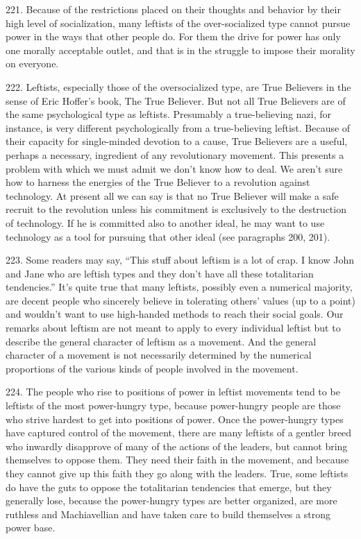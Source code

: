 \documentclass{article}
\begin{document}
221.  Because  of  the  restrictions  placed  on  their  thoughts  and  behavior  by  their  high  level  of  
socialization, many leftists of the over-socialized type cannot pursue power in the ways that other 
people do.  For them the drive for power has only one morally acceptable outlet, and that is in the 
struggle to impose their morality on everyone. \vspace{\baselineskip}

222.  Leftists, especially those of the oversocialized type, are True Believers in the sense of Eric 
Hoffer’s book, The True Believer. But not all True Believers are of the same psychological type 
as leftists.  Presumably a true-believing nazi, for instance, is very different psychologically from a 
true-believing  leftist.   Because  of  their  capacity  for  single-minded  devotion  to  a  cause,  True  
Believers  are  a  useful,  perhaps  a  necessary,  ingredient  of  any  revolutionary  movement.   This 
presents a problem with which we must admit we don’t know how to deal.  We aren’t sure how to 
harness the energies of the True Believer to a revolution against technology.  At present all we can 
say is that no True Believer will make a safe recruit to the revolution unless his commitment is 
exclusively to the destruction of technology.  If he is committed also to another ideal, he may want 
to use technology as a tool for pursuing that other ideal (see paragraphs 200, 201). \vspace{\baselineskip}

223.  Some readers may say, “This stuff about leftism is a lot of crap.  I know John and Jane who 
are  leftish  types  and  they  don’t  have  all  these  totalitarian  tendencies.”  It’s  quite  true  that  many  
leftists, possibly even a numerical majority, are decent people who sincerely believe in tolerating 
others’ values (up to a point) and wouldn’t want to use high-handed methods to reach their social 
goals.  Our remarks about leftism are not meant to apply to every individual leftist but to describe 
the general character of leftism as a movement.  And the general character of a movement is not 
necessarily determined by the numerical proportions of the various kinds of people involved in the 
movement. \vspace{\baselineskip}

224.  The people who rise to positions of power in leftist movements tend to be leftists of the most 
power-hungry type, because power-hungry people are those who strive hardest to get into positions 
of power.  Once the power-hungry types have captured control of the movement, there are many 
leftists of a gentler breed who inwardly disapprove of many of the actions of the leaders, but cannot 
bring themselves to oppose them.  They need their faith in the movement, and because they cannot 
give up this faith they go along with the leaders.  True, some leftists do have the guts to oppose the 
totalitarian tendencies that emerge, but they  generally lose, because the power-hungry types are 
better organized, are more ruthless and Machiavellian and have taken care to build themselves a 
strong power base. \vspace{\baselineskip}
\end{document}
